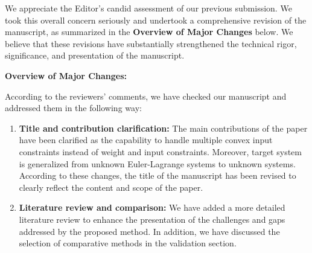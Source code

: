 \documentclass[12pt,english]{reviewresponse}
\begin{document}
\begin{revresponse}[]
  We appreciate the Editor's candid assessment of our previous submission. 
  We took this overall concern seriously and undertook a comprehensive revision of the manuscript, as summarized in the \textbf{Overview of Major Changes} below.
  We believe that these revisions have substantially strengthened the technical rigor, significance, and presentation of the manuscript.

  \vspace{1.2em}

  \textbf{Overview of Major Changes:}

  According to the reviewers' comments, we have checked our manuscript and addressed them in the following way:
  \begin{enumerate}

    \item \textbf{Title and contribution clarification:} 
      The main contributions of the paper have been clarified as the capability to handle multiple convex input constraints instead of weight and input constraints.
      Moreover, target system is generalized from unknown Euler-Lagrange systems to unknown systems.
      According to these changes, the title of the manuscript has been revised to clearly reflect the content and scope of the paper.

    \item \textbf{Literature review and comparison:} 
      We have added a more detailed literature review to enhance the presentation of the challenges and gaps addressed by the proposed method.
      In addition, we have discussed the selection of comparative methods in the validation section.



\end{enumerate}
\end{revresponse}
\end{document}
